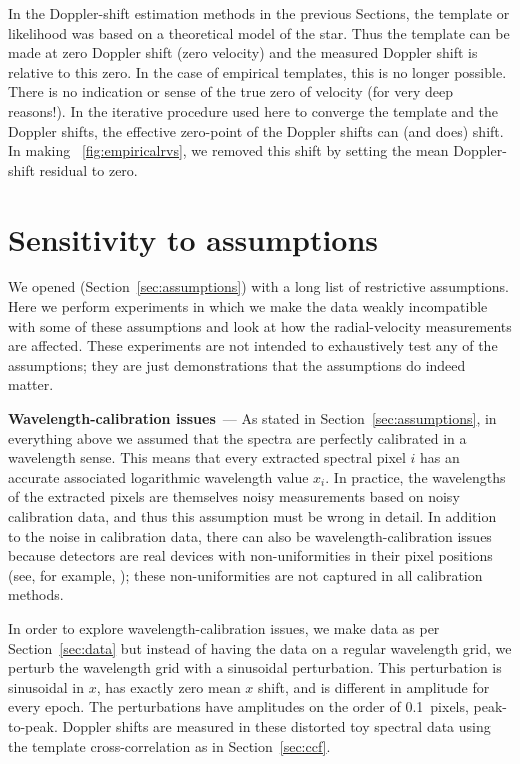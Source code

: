 \documentclass[modern]{aastex631}
\renewcommand{\paragraph}[1]{\bigskip\noindent\textbf{#1}~---}
\newcommand{\sectionname}{Section}
\newcommand{\secref}[1]{\sectionname~\ref{#1}}
\newcommand{\figref}[1]{\figurename~\ref{#1}}
\begin{document}
In the Doppler-shift estimation methods in the previous \sectionname s, the template or likelihood was based on a theoretical model of the star.
Thus the template can be made at zero Doppler shift (zero velocity) and the measured Doppler shift is relative to this zero.
In the case of empirical templates, this is no longer possible.
There is no indication or sense of the true zero of velocity (for very deep reasons!).
In the iterative procedure used here to converge the template and the Doppler shifts, the effective zero-point of the Doppler shifts can (and does) shift.
In making \figref{fig:empiricalrvs}, we removed this shift by setting the mean Doppler-shift residual to zero.

\section{Sensitivity to assumptions}\label{sec:sensitivity}

We opened (\secref{sec:assumptions}) with a long list of restrictive assumptions.
Here we perform experiments in which we make the data weakly incompatible with some of these assumptions and look at how the radial-velocity measurements are affected.
These experiments are not intended to exhaustively test any of the assumptions; they are just demonstrations that the assumptions do indeed matter.

\paragraph{Wavelength-calibration issues}
As stated in \secref{sec:assumptions}, in everything above we assumed that the spectra are perfectly calibrated in a wavelength sense.
This means that every extracted spectral pixel $i$ has an accurate associated logarithmic wavelength value $x_i$.
In practice, the wavelengths of the extracted pixels are themselves noisy measurements based on noisy calibration data, and thus this assumption must be wrong in detail.
In addition to the noise in calibration data, there can also be wavelength-calibration issues because detectors are real devices with non-uniformities in their pixel positions (see, for example, \citealt{excalibur}); these non-uniformities are not captured in all calibration methods.

In order to explore wavelength-calibration issues, we make data as per \secref{sec:data} but instead of having the data on a regular wavelength grid, we perturb the wavelength grid with a sinusoidal perturbation.
This perturbation is sinusoidal in $x$, has exactly zero mean $x$ shift, and is different in amplitude for every epoch.
The perturbations have amplitudes on the order of 0.1~pixels, peak-to-peak.
Doppler shifts are measured in these distorted toy spectral data using the template cross-correlation as in \secref{sec:ccf}.
\end{document}
